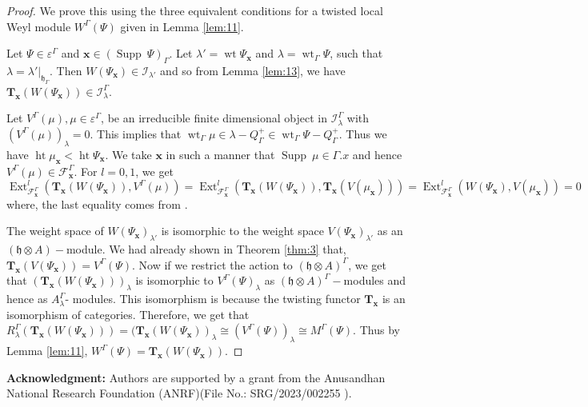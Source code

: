 \documentclass[11pt]{amsart}
\theoremstyle{plain}
\theoremstyle{definition}
\newcommand{\h}{\mathfrak{h}}
\DeclareMathOperator{\Ext}{Ext}
\DeclareMathOperator{\Supp}{Supp}
\DeclareMathOperator{\het}{ht}
\DeclareMathOperator{\wt}{wt}
\begin{document}
\begin{proof}
We prove this using the three equivalent conditions for a twisted local Weyl module $W^{\Gamma}(\Psi)$ given in Lemma \ref{lem:11}.

Let $\Psi\in\varepsilon^{\Gamma}$ and $\textbf{x}\in(\Supp\ \Psi)_{\Gamma}$. Let $\lambda'=\wt\Psi_{\textbf{x}}$ and $\lambda=\wt_{\Gamma}\Psi$, such that $\lambda=\lambda'|_{\h_{\Gamma}}$. Then $W(\Psi_{\textbf{x}})\in\mathcal{I}_{\lambda'}$ and so from Lemma \ref{lem:13}, we have $\textbf{T}_{\textbf{x}}(W(\Psi_{\textbf{x}}))\in\mathcal{I}^{\Gamma}_{\lambda}$.

Let $V^{\Gamma}(\mu),  \mu\in\varepsilon^{\Gamma}$, be an irreducible finite dimensional object in $\mathcal{I}_{\lambda}^{\Gamma}$ with $(V^{\Gamma}(\mu))_{\lambda}=0$. This implies that $\wt_{\Gamma}\mu\in\lambda-Q^{+}_{\Gamma}\in \wt_{\Gamma}\Psi-Q^{+}_{\Gamma}$. Thus we have $\het\mu_{\textbf{x}}<\het\Psi_{\textbf{x}}$. We take $\textbf{x}$ in such a manner that $\Supp~\mu\in\Gamma. x$ and hence $V^{\Gamma}(\mu)\in\mathcal{F}_{\textbf{x}}^{\Gamma}$. For $l=0,1$, we get
\begin{equation*}
     \Ext^{l}_{\mathcal{F}_{\textbf{x}}^{\Gamma}}(\textbf{T}_{\textbf{x}}(W(\Psi_{\textbf{x}})),V^{\Gamma}(\mu))=\Ext^{l}_{\mathcal{F}_{\textbf{x}}^{\Gamma}}(\textbf{T}_{\textbf{x}}(W(\Psi_{\textbf{x}})),\textbf{T}_{\textbf{x}}(V(\mu_{\textbf{x}})))=\Ext^{l}_{\mathcal{F}_{\textbf{x}}^{\Gamma}}(W(\Psi_{\textbf{x}}),V(\mu_{\textbf{x}}))=0
\end{equation*}
 where, the last equality comes from \cite[theorem A.3]{BCM19}. 
 
 The weight space of $W(\Psi_{\textbf{x}})_{\lambda'}$ is isomorphic to the weight space $V(\Psi_{\textbf{x}})_{\lambda'}$ as an $(\h\otimes A)-$module. We had already shown in Theorem \ref{thm:3} that, $\textbf{T}_{\textbf{x}}(V(\Psi_{\textbf{x}}))=V^{\Gamma}(\Psi)$. Now if we restrict the action to $(\h\otimes A)^{\Gamma}$, we get that $(\textbf{T}_{\textbf{x}}(W(\Psi_{\textbf{x}})))_{\lambda}$ is isomorphic to $V^{\Gamma}(\Psi)_{\lambda}$ as $(\h\otimes A)^{\Gamma}-$modules and hence as $A_{\lambda}^{\Gamma}$- modules. This isomorphism is because the twisting functor $\textbf{T}_{\textbf{x}}$ is an isomorphism of categories. Therefore, we get that $R_{\lambda}^{\Gamma}(\textbf{T}_{\textbf{x}}(W(\Psi_\textbf{x})))=(\textbf{T}_{\textbf{x}}(W(\Psi_{\textbf{x}}))_{\lambda}\cong (V^{\Gamma}(\Psi))_{\lambda}\cong M^{\Gamma}(\Psi)$. Thus by Lemma \ref{lem:11}, $W^{\Gamma}(\Psi)=\textbf{T}_{\textbf{x}}(W(\Psi_{\textbf{x}}))$.
\end{proof}

{\bf Acknowledgment:} Authors are supported by a grant from the Anusandhan National Research Foundation (ANRF)(File No.: SRG/2023/002255 ). 










  
    
\end{document}
